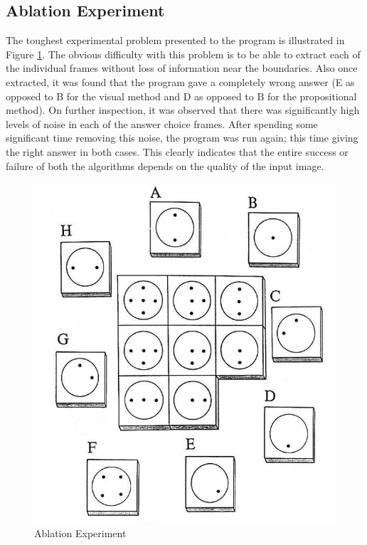 \documentclass[10pt, letter]{article}
\begin{document}
\subsection*{Ablation Experiment}
The toughest experimental problem presented to the program is illustrated in Figure \ref{exp2}. The obvious difficulty with this problem is to be able to extract each of the individual frames without loss of information near the boundaries. Also once extracted, it was found that the program gave a completely wrong answer (E as opposed to B for the visual method and D as opposed to B for the propositional method). On further inspection, it was observed that there was significantly high levels of noise in each of the answer choice frames. After spending some significant time removing this noise, the program was run again; this time giving the right answer in both cases. This clearly indicates that the entire success or failure of both the algorithms depends on the quality of the input image.

\begin{figure}[h!]
  \centering
    \includegraphics[scale = 0.25]{Images/Exp2}
    \caption{Ablation Experiment}
  \label{exp2}
\end{figure}
\end{document}
